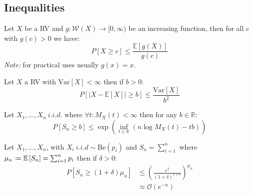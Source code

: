 \documentclass[8pt,a4paper]{extarticle}     %
\newcommand{\R}{\mathbb{R}}
\newcommand{\colnull}{\vfill\null\columnbreak}
\newcommand{\eqdef}{\mathrel{\vcenter{\baselineskip0.5ex\lineskiplimit0pt\hbox{\scriptsize.}\hbox{\scriptsize.}}}=}
\newcommand{\Var}{\mathrm{Var}}
\begin{document}
\begin{multicols}{4}
\subsection{Inequalities}
\begin{boxtheorem} 
	Let $X$ be a RV and $g:\mathcal{W}(X)\rightarrow[0,\infty)$ be an increasing function, then for all $c$ with $g(c)>0$ we have:
	\[
		P\left[X\geq c\right] \leq \frac{\mathbb{E}\left[g(X)\right]}{g(c)}	
	\]
	\textit{Note:} for practical uses usually $g(x)=x$. 
\end{boxtheorem}
\begin{boxtheorem} 
	Let $X$ a RV with $\Var\left[X\right]<\infty$ then if $b>0$:
	\[
		P\left[\left\lvert X-\mathbb{E}\left[X\right]\right\rvert \geq b \right] \leq \frac{\Var\left[X\right]}{b^2}
	\]	
\end{boxtheorem}
\begin{boxtheorem}
	Let $X_1,\dots,X_n \ i.i.d.$ where $\forall t:M_X(t)<\infty$ then for any $b\in\R$:
	\[
		P\left[S_n\geq b\right] \leq \exp\left(\inf_{t\in\R}(n\log M_X(t)-tb)\right)
	\]
\end{boxtheorem}
\begin{boxtheorem} 
	Let $X_1,\dots,X_n$, with $X_i \ i.i.d \sim \mathrm{Be}(p_i)$ and $S_n=\sum_{i=1}^{n}$ where $\mu_n\eqdef\mathbb{E}\left[S_n\right]=\sum_{i=1}^{n}p_i$ then if $\delta>0$:
	\[ 
		\begin{split}
			P\left[S_n\geq (1+\delta)\mu_n\right] &\leq \left(\frac{e^\delta}{(1+\delta)^{1+\delta}}\right)^{\mu_n} \\ &\approx\mathcal{O}(e^{-n})
		\end{split}
	\]
\end{boxtheorem}
\colnull 

\end{multicols}
\end{document}
